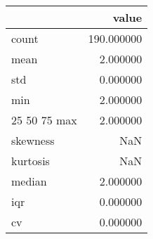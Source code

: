 \begin{tabular}{lr}
\toprule
 & value \\
\midrule
count & 190.000000 \\
mean & 2.000000 \\
std & 0.000000 \\
min & 2.000000 \\
25%
50%
75%
max & 2.000000 \\
skewness & NaN \\
kurtosis & NaN \\
median & 2.000000 \\
iqr & 0.000000 \\
cv & 0.000000 \\
\bottomrule
\end{tabular}
